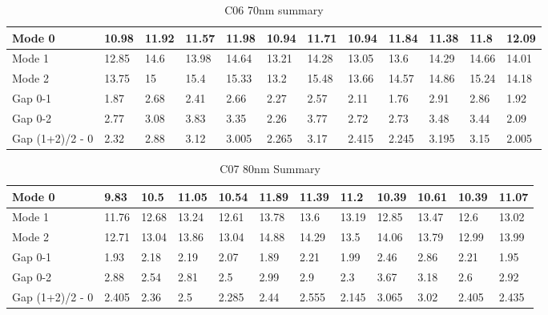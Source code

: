 \begin{table}[]
\centering
\begin{tabular}{|l|l|l|l|l|l|l|l|l|l|l|l|}
\hline
Mode 0 & 10.98 & 11.92 & 11.57 & 11.98 & 10.94 & 11.71 & 10.94 & 11.84 & 11.38 & 11.8 & 12.09 \\ \hline
Mode 1 & 12.85 & 14.6 & 13.98 & 14.64 & 13.21 & 14.28 & 13.05 & 13.6 & 14.29 & 14.66 & 14.01 \\ \hline
Mode 2 & 13.75 & 15 & 15.4 & 15.33 & 13.2 & 15.48 & 13.66 & 14.57 & 14.86 & 15.24 & 14.18 \\ \hline
Gap 0-1 & 1.87 & 2.68 & 2.41 & 2.66 & 2.27 & 2.57 & 2.11 & 1.76 & 2.91 & 2.86 & 1.92 \\ \hline
Gap 0-2 & 2.77 & 3.08 & 3.83 & 3.35 & 2.26 & 3.77 & 2.72 & 2.73 & 3.48 & 3.44 & 2.09 \\ \hline
Gap (1+2)/2 - 0 & 2.32 & 2.88 & 3.12 & 3.005 & 2.265 & 3.17 & 2.415 & 2.245 & 3.195 & 3.15 & 2.005 \\ \hline
\end{tabular}
\caption{C06 70nm summary}
\label{C06summary}
\end{table}



\begin{table}[]
\centering
\begin{tabular}{|l|l|l|l|l|l|l|l|l|l|l|l|}
\hline
Mode 0 & 9.83 & 10.5 & 11.05 & 10.54 & 11.89 & 11.39 & 11.2 & 10.39 & 10.61 & 10.39 & 11.07 \\ \hline
Mode 1 & 11.76 & 12.68 & 13.24 & 12.61 & 13.78 & 13.6 & 13.19 & 12.85 & 13.47 & 12.6 & 13.02 \\ \hline
Mode 2 & 12.71 & 13.04 & 13.86 & 13.04 & 14.88 & 14.29 & 13.5 & 14.06 & 13.79 & 12.99 & 13.99 \\ \hline
Gap 0-1 & 1.93 & 2.18 & 2.19 & 2.07 & 1.89 & 2.21 & 1.99 & 2.46 & 2.86 & 2.21 & 1.95 \\ \hline
Gap 0-2 & 2.88 & 2.54 & 2.81 & 2.5 & 2.99 & 2.9 & 2.3 & 3.67 & 3.18 & 2.6 & 2.92 \\ \hline
Gap (1+2)/2 - 0 & 2.405 & 2.36 & 2.5 & 2.285 & 2.44 & 2.555 & 2.145 & 3.065 & 3.02 & 2.405 & 2.435 \\ \hline
\end{tabular}
\caption{C07 80nm Summary}
\label{C07summary}
\end{table}





